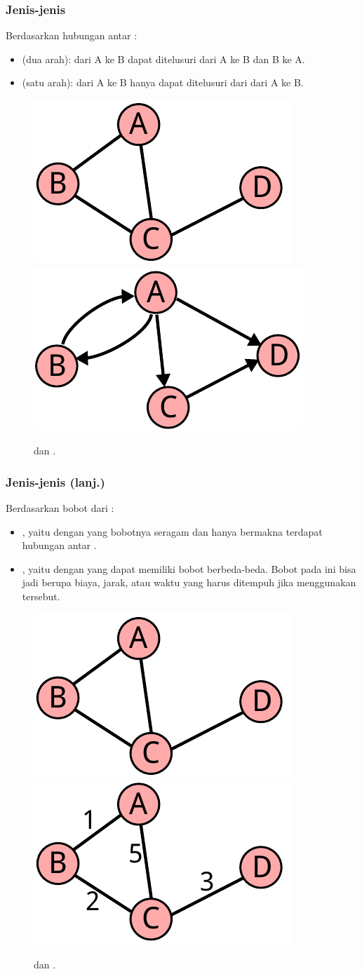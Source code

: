 \begin{frame}
\frametitle{Jenis-jenis \fGraph}
Berdasarkan hubungan antar \fnode:
\begin{itemize}
  \item {} \fgraph (dua arah): \fedge dari A ke B dapat ditelusuri dari A ke B dan B ke A. 
  \item {} \fgraph (satu arah): \fedge dari A ke B hanya dapat ditelusuri dari dari A ke B.
\end{itemize}
\begin{figure}
  \centering
  \includegraphics[width=4 cm]{asset/unweighted-undirected.pdf}
  \ \ \ \ \ \ %
  \includegraphics[width=4 cm]{asset/unweighted-directed.pdf}
  
   dan  \fgraph.
\end{figure}
\end{frame}

\begin{frame}
\frametitle{Jenis-jenis \fGraph (lanj.)}
Berdasarkan bobot dari \fedge:
\begin{itemize}
  \item {} \fGraph, yaitu \fgraph dengan \fedge yang bobotnya seragam dan hanya bermakna terdapat hubungan antar \fnode.
  \item {} \fGraph, yaitu \fgraph dengan \fedge yang dapat memiliki bobot berbeda-beda. Bobot pada \fedge ini bisa jadi berupa biaya, jarak, atau waktu yang harus ditempuh jika menggunakan \fedge tersebut.
\end{itemize}
\begin{figure}
  \centering
  \includegraphics[width=4 cm]{asset/unweighted-undirected.pdf}
  \ \ \ \ \ \ %
  \includegraphics[width=4 cm]{asset/weighted-undirected.pdf}
  
   dan  \fgraph.
\end{figure}
\end{frame}

